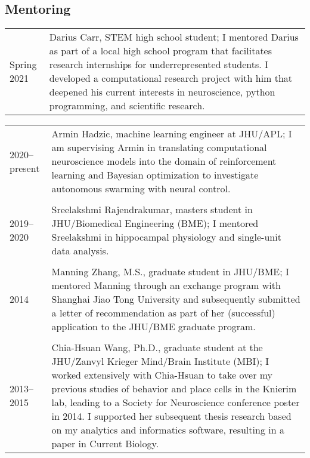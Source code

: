 \documentclass[10pt]{article}
\begin{document}
\subsection*{Mentoring}

\begin{tabular}{@{\hspace{0.2in}}l>{\raggedright\arraybackslash}p{}}
  Spring 2021 \hspace{0.1in} & Darius Carr, STEM high school student; I mentored
  Darius as part of a local high school program that facilitates research
  internships for underrepresented students. I developed a computational
  research project with him that deepened his current interests in neuroscience,
  python programming, and scientific research. \\
\end{tabular}
\begin{tabular}{@{\hspace{0.2in}}l>{\raggedright\arraybackslash}p{}}
  2020--present \hspace{0.1in} & Armin Hadzic, machine learning engineer at JHU/APL; I
  am supervising Armin in translating computational neuroscience models into
  the domain of reinforcement learning and Bayesian optimization to investigate
  autonomous swarming with neural control. \\
  \tabularnewline
  2019--2020 \hspace{0.1in} & Sreelakshmi Rajendrakumar, masters student in
  JHU/Biomedical Engineering (BME); I mentored Sreelakshmi in hippocampal
  physiology and single-unit data analysis.\\
  \tabularnewline
  2014 & Manning Zhang, M.S., graduate student in JHU/BME; I mentored Manning
  through an exchange program with Shanghai Jiao Tong University and
  subsequently submitted a letter of recommendation as part of her (successful)
  application to the JHU/BME graduate program.\\
  \tabularnewline
  2013--2015 & Chia-Hsuan Wang, Ph.D., graduate student at the JHU/Zanvyl
  Krieger Mind/Brain Institute (MBI); I worked extensively with Chia-Hsuan to
  take over my previous studies of behavior and place cells in the Knierim lab,
  leading to a Society for Neuroscience conference poster in 2014. I supported
  her subsequent thesis research based on my analytics and informatics software,
  resulting in a paper in Current Biology.\\
\end{tabular}
\end{document}
